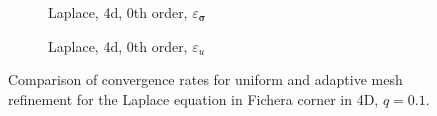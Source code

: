 \documentclass[a4paper,12pt]{amsart}
\numberwithin{equation}{section}
\def\bsigma{{\boldsymbol \sigma}}
\begin{document}
\begin{figure}[h!]
\centering
\begin{subfigure}[t]{0.49\textwidth}
	\caption{Laplace, 4d, 0th order, $\varepsilon_{\bsigma}$}
\end{subfigure}
	\hfill
\begin{subfigure}[t]{0.49\textwidth}
	\caption{Laplace, 4d, 0th order, $\varepsilon_u$}
\end{subfigure}
	
\caption{Comparison of convergence rates for uniform and adaptive mesh refinement for the Laplace equation in Fichera corner in 4D, $q = 0.1$.}
\label{fig:comparison_ur_amr_lapl4d}
\end{figure}
\end{document}
